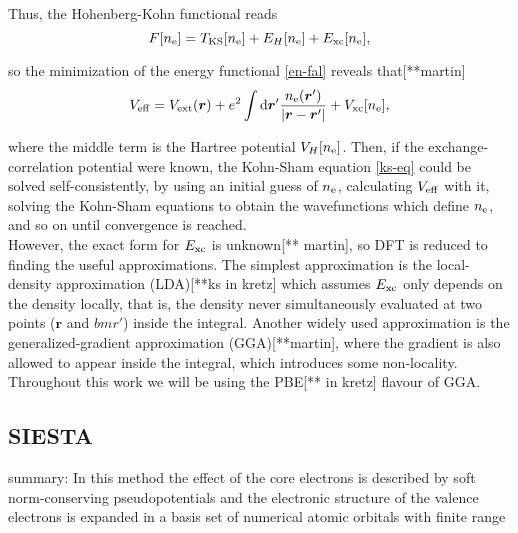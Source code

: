 Thus, the Hohenberg-Kohn functional reads
\begin{equation}
F[n_{\mathrm{e}}]=T_{\mathrm{KS}}[n_{\mathrm{e}}]+E_{H}[n_{\mathrm{e}}]+E_{\mathrm{xc}}[n_{\mathrm{e}}],
\end{equation}

so the minimization of the energy functional \ref{en-fal} reveals that[**martin]
\begin{equation}
V_{\mathrm{eff}}=V_{\mathrm{ext}}(\bm r)+e^2\int\mathrm{d}\bm r'\frac{n_{\mathrm{e}}(\bm r')}{\abs{\bm r-\bm r'}}+V_{\mathrm{xc}}[n_{\mathrm{e}}],
\end{equation}

where the middle term is the Hartree potential \(V_{H}[n_{\mathrm{e}}]\). Then, if the exchange-correlation potential were known, the Kohn-Sham equation \ref{ks-eq} could be solved self-consistently, by using an initial guess of \(n_{\mathrm{e}}\), calculating \(V_{\mathrm{eff}}\) with it, solving the Kohn-Sham equations to obtain the wavefunctions which define \(n_{\mathrm{e}}\), and so on until convergence is reached.\\

However, the exact form for \(E_{\mathrm{xc}}\) is unknown[** martin], so DFT is reduced to finding the useful approximations. The simplest approximation is the local-density approximation (LDA)[**ks in kretz] which assumes \(E_{\mathrm{xc}}\) only depends on the density locally, that is, the density never simultaneously evaluated at two points (\(\bm r\) and \(bm r'\)) inside the integral. Another widely used approximation is the generalized-gradient approximation (GGA)[**martin], where the gradient is also allowed to appear inside the integral, which introduces some non-locality. Throughout this work we will be using the PBE[** in kretz] flavour of GGA.


\subsection{SIESTA}
summary: In this method the effect of
the core electrons is described by soft norm-conserving
pseudopotentials and the electronic structure of the valence
electrons is expanded in a basis set of numerical atomic orbitals with finite range

